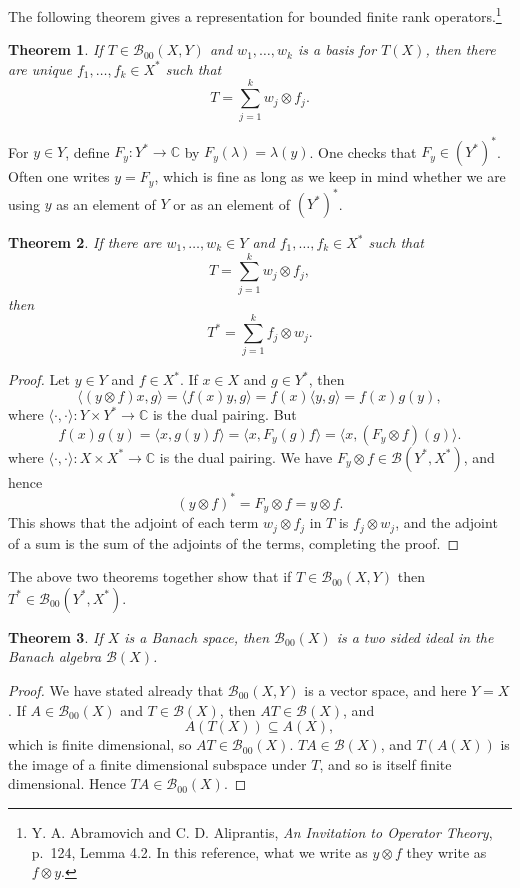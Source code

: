 \documentclass{article}
\newcommand{\inner}[2]{\langle #1, #2 \rangle}
\newtheorem{theorem}{Theorem}
\begin{document}
The following theorem gives a representation for bounded finite rank operators.\footnote{Y. A. Abramovich and C. D. Aliprantis,
{\em An Invitation to Operator Theory}, p.~124, Lemma 4.2. In this reference, what we write as $y \otimes f$ they write as $f \otimes y$.} 

\begin{theorem}
If $T \in \mathscr{B}_{00}(X,Y)$ and $w_1,\ldots,w_k$ is a basis for $T(X)$, then there are unique $f_1,\ldots,f_k \in X^*$ such that
\[
T = \sum_{j=1}^k w_j \otimes f_j.
\]
\label{finiteranksum}
\end{theorem}


For $y \in Y$, define $F_y:Y^* \to \mathbb{C}$ by $F_y(\lambda)=\lambda(y)$. One checks that $F_y \in (Y^*)^*$. 
Often one writes 
$y=F_y$, which is fine as long as we keep in mind whether we are using $y$ as an element of $Y$ or as an element of $(Y^*)^*$. 

\begin{theorem}
If there are $w_1,\ldots,w_k \in Y$ and $f_1,\ldots,f_k \in X^*$ such that
\[
T = \sum_{j=1}^k w_j \otimes f_j,
\]
then
\[
T^* = \sum_{j=1}^k f_j \otimes w_j.
\]
\label{finiterankadjoint}
\end{theorem}
\begin{proof}
Let $y \in Y$ and $f \in X^*$. If $x \in X$ and $g \in Y^*$, then
\[
\inner{(y \otimes f)x}{g}=\inner{f(x)y}{g}=f(x)\inner{y}{g}=f(x)g(y),
\]
where $\inner{\cdot}{\cdot}:Y \times Y^* \to \mathbb{C}$  is the dual pairing. But
\[
f(x)g(y)=\inner{x}{g(y)f} = \inner{x}{F_y(g)f} = \inner{x}{(F_y \otimes f)(g)}.
\]
where $\inner{\cdot}{\cdot}:X \times X^* \to \mathbb{C}$  is the dual pairing. We have $F_y \otimes f \in \mathscr{B}(Y^*,X^*)$, and hence
\[
(y \otimes f)^*=F_y \otimes f=y \otimes f.
\]
This shows that the adjoint of each term $w_j \otimes f_j$ in $T$ is $f_j \otimes w_j$, and the adjoint of a sum is the sum of the adjoints of the terms, completing the proof.
\end{proof}

The above two theorems together show that if $T \in \mathscr{B}_{00}(X,Y)$ then $T^* \in \mathscr{B}_{00}(Y^*,X^*)$.


\begin{theorem}
If $X$ is a Banach space, then $\mathscr{B}_{00}(X)$ is a two sided ideal in the Banach algebra $\mathscr{B}(X)$. 
\end{theorem}
\begin{proof}
We have stated already that $\mathscr{B}_{00}(X,Y)$ is a vector space, and here $Y=X$. If $A \in \mathscr{B}_{00}(X)$ and $T \in \mathscr{B}(X)$, then $AT \in \mathscr{B}(X)$, and 
\[
A(T(X)) \subseteq A(X),
\]
which is finite dimensional, so $AT \in \mathscr{B}_{00}(X)$. $TA \in \mathscr{B}(X)$, and $T(A(X))$ is the image of a finite dimensional subspace under $T$, and so is itself finite dimensional. Hence $TA \in \mathscr{B}_{00}(X)$. 
\end{proof}
\end{document}
